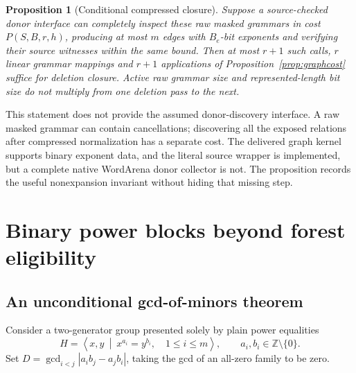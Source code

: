 \documentclass[11pt]{article}
\newtheorem{proposition}[theorem]{Proposition}
\theoremstyle{definition}\newtheorem{definition}[theorem]{Definition}
\theoremstyle{remark}\newtheorem{remark}[theorem]{Remark}
\newcommand{\Z}{\mathbb Z}\newcommand{\Q}{\mathbb Q}\newcommand{\F}{\mathbb F}
\begin{document}
\begin{proposition}[Conditional compressed closure]\label{prop:compressed}
Suppose a source-checked donor interface can completely inspect these raw
masked grammars in cost $P(S,B,r,h)$, producing at most $m$ edges with
$B_e$-bit exponents and verifying their source witnesses within the same
bound. Then at most $r+1$ such calls, $r$ linear grammar mappings and
$r+1$ applications of Proposition~\ref{prop:graphcost} suffice for deletion
closure. Active raw grammar size and represented-length bit size do not
multiply from one deletion pass to the next.
\end{proposition}
This statement does not provide the assumed donor-discovery interface.
A raw masked grammar can contain cancellations; discovering all the exposed
relations after compressed normalization has a separate cost. The delivered
graph kernel supports binary exponent data, and the literal source wrapper
is implemented, but a complete native WordArena donor collector is not.
The proposition records the useful nonexpansion invariant without hiding
that missing step.

\section{Binary power blocks beyond forest eligibility}
\label{sec:binary}
\subsection{An unconditional gcd-of-minors theorem}
Consider a two-generator group presented solely by plain power equalities
\begin{equation}\label{eq:block}
 H=\left\langle x,y\ \middle|\ x^{a_i}=y^{b_i},\quad
 1\le i\le m\right\rangle,
 \qquad a_i,b_i\in\Z\setminus\{0\}.
\end{equation}
Set $D=\gcd_{i<j}|a_i b_j-a_j b_i|$, taking the gcd of an all-zero family
to be zero.
\end{document}
